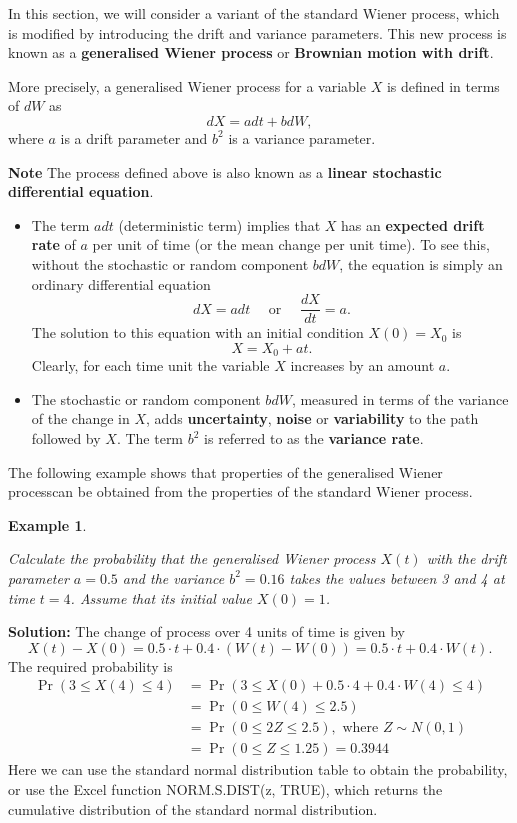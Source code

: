 \documentclass[landscape, 20pt]{extreport}
\theoremstyle{definition}
\theoremstyle{definition}
\newtheorem{example}{Example}[chapter]
\theoremstyle{definition}
\theoremstyle{definition}
\theoremstyle{remark}
\begin{document}
In this section, we will consider a variant of the standard Wiener
process, which is modified by introducing the drift and variance
parameters. This new process is known as a \textbf{generalised Wiener
process} or \textbf{Brownian motion with drift}.

More precisely, a generalised Wiener process for a variable \(X\) is
defined in terms of \(dW\) as \[dX = a dt + b dW,\] where \(a\) is a drift
parameter and \(b^2\) is a variance parameter.

\textbf{Note} The process defined above is also known as a \textbf{linear
stochastic differential equation}.

\begin{itemize}
\item
  The term \(a dt\) (deterministic term) implies that \(X\) has an
  \textbf{expected drift rate} of \(a\) per unit of time (or the mean change
  per unit time). To see this, without the stochastic or random
  component \(b dW\), the equation is simply an ordinary differential
  equation \[dX = a dt \quad \text{ or } \quad \frac{dX}{dt} = a.\]
  The solution to this equation with an initial condition \(X(0) = X_0\)
  is \[X = X_0 + a t.\] Clearly, for each time unit the variable \(X\)
  increases by an amount \(a\).
\item
  The stochastic or random component \(b dW\), measured in terms of the
  variance of the change in \(X\), adds \textbf{uncertainty}, \textbf{noise} or
  \textbf{variability} to the path followed by \(X\). The term \(b^2\) is
  referred to as the \textbf{variance rate}.
\end{itemize}

The following example shows that properties of the generalised Wiener
processcan be obtained from the properties of the standard Wiener
process.

\newpage \begin{example}
\protect\hypertarget{exm:unlabeled-div-69}{}\label{exm:unlabeled-div-69}

\emph{Calculate the probability that the generalised Wiener
process \(X(t)\) with the drift parameter \(a = 0.5\) and the variance
\(b^2 = 0.16\) takes the values between 3 and 4 at time \(t = 4\). Assume
that its initial value \(X(0) = 1\).}

\end{example}

\textbf{Solution:} The change of process over 4 units of time is given by
\[X(t) - X(0) = 0.5 \cdot t + 0.4 \cdot (W(t) - W(0)) = 0.5 \cdot t + 0.4 \cdot W(t) .\]
The required probability is \[\begin{aligned}
        \Pr(3 \le X(4) \le 4) &= \Pr( 3 \le  X(0) + 0.5 \cdot 4 + 0.4 \cdot W(4)   \le 4  )\\
            &= \Pr(0 \le W(4) \le 2.5) \\
            &= \Pr(0 \le 2 Z \le 2.5), \text{ where }  Z \sim N(0,1) \\
            &= \Pr(0 \le Z \le 1.25) = 0.3944
    \end{aligned}\] Here we can use the standard normal distribution
table to obtain the probability, or use the Excel function
NORM.S.DIST(z, TRUE), which returns the cumulative distribution of the
standard normal distribution.
\end{document}
